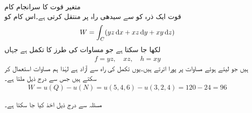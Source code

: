 \quad متغیر قوت کا سرانجام  کام\\
قوت  ایک ذرہ کو  سے سیدھی راہ پر  منتقل کرتی ہے۔اس کام کو
\begin{align*}
W=\int_C(yz\dif x+xz\dif y+xy\dif z)
\end{align*}
لکھا جا سکتا ہے جو مساوات  کی طرز کا تکمل ہے جہاں
\begin{align*}
f=yz,\quad xz,\quad h=xy
\end{align*}
ہیں جو  لیتے ہوئے مساوات  پر پورا اترتے ہیں۔یوں  تکمل کی راہ سے آزاد ہے  لہٰذا ہم مساوات  استعمال کر سکتے ہیں جس سے درج ذیل ملتا ہے۔
\begin{align*}
W=u(Q)-u(N)=u(5,4,6)-u(3,2,4)=120-24=96
\end{align*}

مسئلہ  سے درج ذیل اخذ کیا جا سکتا ہے۔

